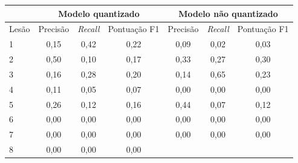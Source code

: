 \clearpage

\begin{table}[ht]
    \centering
    \begin{tabular}{l|c|c|c|c|c|c}
        \hline
              & \multicolumn{3}{c|}{Modelo quantizado} & \multicolumn{3}{c}{Modelo não quantizado}
        \\ \hline
        Lesão & Precisão                               & \textit{Recall}                           & Pontuação
        F1    & Precisão                               & \textit{Recall}                           & Pontuação
        F1
        \\ \hline
        1     & 0,15                                   & 0,42                                      & 0,22
              & 0,09                                   & 0,02                                      & 0,03
        \\
        2     & 0,50                                   & 0,10                                      & 0,17
              & 0,33                                   & 0,27                                      & 0,30
        \\
        3     & 0,16                                   & 0,28                                      & 0,20
              & 0,14                                   & 0,65                                      & 0,23
        \\
        4     & 0,11                                   & 0,05                                      & 0,07
              & 0,00                                   & 0,00                                      & 0,00
        \\
        5     & 0,26                                   & 0,12                                      & 0,16
              & 0,44                                   & 0,07                                      & 0,12
        \\
        6     & 0,00                                   & 0,00                                      & 0,00
              & 0,00                                   & 0,00                                      & 0,00
        \\
        7     & 0,00                                   & 0,00                                      & 0,00
              & 0,00                                   & 0,00                                      & 0,00
        \\
        8     & 0,00                                   & 0,00                                      & 0,00

\end{tabular}
\end{table}
